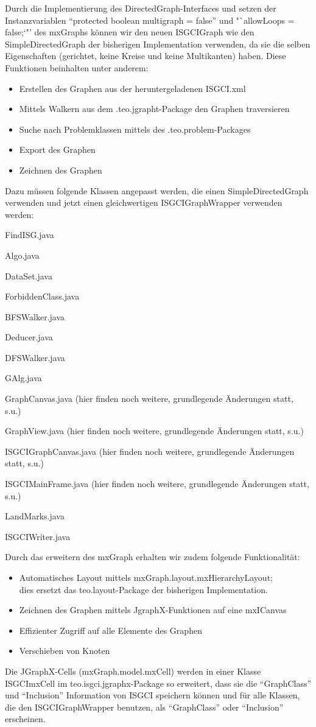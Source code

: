 \documentclass[10pt,a4paper]{article}
\begin{document}
Durch die Implementierung des DirectedGraph-Interfaces und setzen der Instanzvariablen "`protected boolean multigraph = false"' und "`allowLoops = false;`"' des mxGraphs können wir den neuen ISGCIGraph wie den SimpleDirectedGraph der bisherigen Implementation verwenden, da sie die selben Eigenschaften (gerichtet, keine Kreise und keine Multikanten) haben. Diese Funktionen beinhalten unter anderem: \begin{itemize}
\item Erstellen des Graphen aus der heruntergeladenen ISGCI.xml
\item Mittels Walkern aus dem .teo.jgrapht-Package den Graphen traversieren
\item Suche nach Problemklassen mittels des .teo.problem-Packages
\item Export des Graphen
\item Zeichnen des Graphen

\end{itemize}
Dazu müssen folgende Klassen angepasst werden, die einen SimpleDirectedGraph verwenden und jetzt einen gleichwertigen ISGCIGraphWrapper verwenden werden: \begin{description}
\item FindISG.java
\item Algo.java
\item DataSet.java
\item ForbiddenClass.java
\item BFSWalker.java
\item Deducer.java
\item DFSWalker.java
\item GAlg.java
\item GraphCanvas.java (hier finden noch weitere, grundlegende Änderungen statt, s.u.)
\item GraphView.java (hier finden noch weitere, grundlegende Änderungen statt, s.u.)
\item ISGCIGraphCanvas.java (hier finden noch weitere, grundlegende Änderungen statt, s.u.)
\item ISGCIMainFrame.java (hier finden noch weitere, grundlegende Änderungen statt, s.u.)
\item LandMarks.java
\item ISGCIWriter.java
\end{description}
 Durch das erweitern des mxGraph erhalten wir zudem folgende Funktionalität: 
 \begin{itemize}
 \item Automatisches Layout mittels mxGraph.layout.mxHierarchyLayout; \\dies ersetzt das teo.layout-Package der bisherigen Implementation.
 \item Zeichnen des Graphen mittels JgraphX-Funktionen auf eine mxICanvas
 \item Effizienter Zugriff auf alle Elemente des Graphen
 \item Verschieben von Knoten
 \end{itemize}
Die JGraphX-Cells (mxGraph.model.mxCell) werden in einer Klasse ISGCImxCell im teo.isgci.jgraphx-Package so erweitert, dass sie die "`GraphClass"' und "`Inclusion"' Information von ISGCI speichern können und für alle Klassen, die den ISGCIGraphWrapper benutzen, als "`GraphClass"' oder "`Inclusion"' erscheinen.
\end{document}
